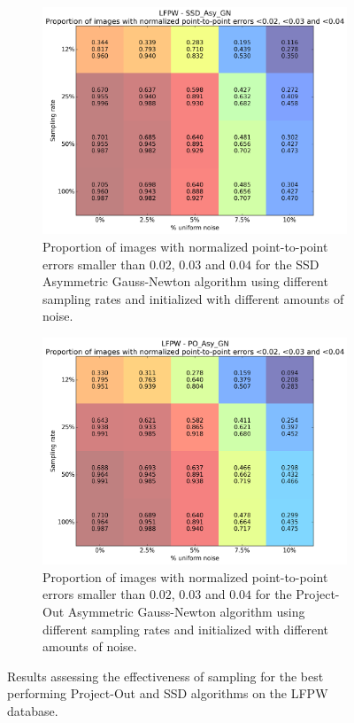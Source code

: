 \begin{figure}[h!]
	\centering
	\begin{subfigure}{0.48\textwidth}
	    \includegraphics[width=\textwidth]{experiments/sampling/sampling_vs_noise_ssd_asy_gn.png}
	    \caption{Proportion of images with normalized point-to-point errors smaller than $0.02$, $0.03$ and $0.04$ for the SSD Asymmetric Gauss-Newton algorithm using different sampling rates and initialized with different amounts of noise.}
	    \label{fig:sampling_vs_noise_ssd_asy_gn}
	\end{subfigure}
	\hfill
	\begin{subfigure}{0.48\textwidth}
	    \includegraphics[width=\textwidth]{experiments/sampling/sampling_vs_noise_po_asy_gn.png}
	    \caption{Proportion of images with normalized point-to-point errors smaller than $0.02$, $0.03$ and $0.04$ for the Project-Out Asymmetric Gauss-Newton algorithm using different sampling rates and initialized with different amounts of noise.}
	    \label{fig:sampling_vs_noise_po_asy_gn}
	\end{subfigure}
	\label{fig:sampling}
	\caption{Results assessing the effectiveness of sampling for the best performing Project-Out and SSD algorithms on the LFPW database.}
\end{figure}


